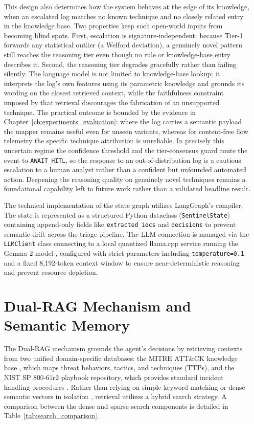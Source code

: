 This design also determines how the system behaves at the edge of its knowledge, when an escalated log matches no known technique and no closely related entry in the knowledge base. Two properties keep such open-world inputs from becoming blind spots. First, escalation is signature-independent: because Tier-1 forwards any statistical outlier (a Welford deviation), a genuinely novel pattern still reaches the reasoning tier even though no rule or knowledge-base entry describes it. Second, the reasoning tier degrades gracefully rather than failing silently. The language model is not limited to knowledge-base lookup; it interprets the log's own features using its parametric knowledge and grounds its wording on the closest retrieved context, while the faithfulness constraint imposed by that retrieval discourages the fabrication of an unsupported technique. The practical outcome is bounded by the evidence in Chapter~\ref{ch:experiments_evaluation}: where the log carries a semantic payload the mapper remains useful even for unseen variants, whereas for content-free flow telemetry the specific technique attribution is unreliable. In precisely this uncertain regime the confidence threshold and the tier-consensus guard route the event to \texttt{AWAIT\_HITL}, so the response to an out-of-distribution log is a cautious escalation to a human analyst rather than a confident but unfounded automated action. Deepening the reasoning quality on genuinely novel techniques remains a foundational capability left to future work rather than a validated headline result.

The technical implementation of the state graph utilizes LangGraph's compiler. The state is represented as a structured Python dataclass (\texttt{SentinelState}) containing append-only fields like \texttt{extracted\_iocs} and \texttt{decisions} to prevent semantic drift across the triage pipeline. The LLM connection is managed via the \texttt{LLMClient} class connecting to a local quantized llama.cpp service running the Gemma 2 model \cite{gemma_2_2024}, configured with strict parameters including \texttt{temperature=0.1} and a fixed 8{,}192-token context window to ensure near-deterministic reasoning and prevent resource depletion.

\section{Dual-RAG Mechanism and Semantic Memory}

The Dual-RAG mechanism grounds the agent's decisions by retrieving contexts from two unified domain-specific databases: the MITRE ATT\&CK knowledge base \cite{strom2018mitre}, which maps threat behaviors, tactics, and techniques (TTPs), and the NIST SP 800-61r2 playbook repository, which provides standard incident handling procedures \cite{nist80061}. Rather than relying on simple keyword matching or dense semantic vectors in isolation \cite{rag2020}, retrieval utilizes a hybrid search strategy. A comparison between the dense and sparse search components is detailed in Table~\ref{tab:search_comparison}.

